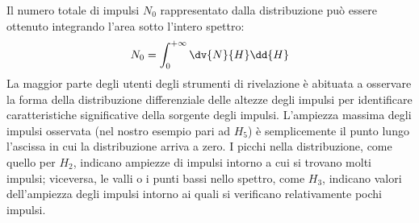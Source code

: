 \begin{approfondimento}
   Il numero totale di impulsi $N_0$ rappresentato dalla distribuzione può essere ottenuto integrando l'area sotto l'intero spettro:
   \begin{equation*}
      N_0=\int_{0}^{+\infty} \dv{N}{H} \dd{H}
   \end{equation*}
   La maggior parte degli utenti degli strumenti di rivelazione è abituata a osservare la forma della distribuzione differenziale delle altezze degli impulsi per identificare caratteristiche significative della sorgente degli impulsi. L'ampiezza massima degli impulsi osservata (nel nostro esempio pari ad $H_5$) è semplicemente il punto lungo l'ascissa in cui la distribuzione arriva a zero. I picchi nella distribuzione, come quello per $H_2$, indicano ampiezze di impulsi intorno a cui si trovano molti impulsi; viceversa, le valli o i punti bassi nello spettro, come $H_3$, indicano valori dell'ampiezza degli impulsi intorno ai quali si verificano relativamente pochi impulsi.
   
\end{approfondimento}

